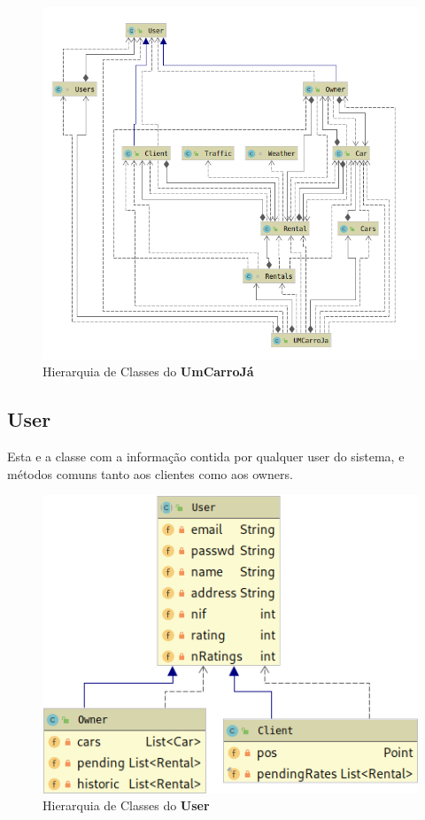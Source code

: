 \documentclass[a4paper]{report}
\begin{document}
\begin{figure}[h]
    \centering
    \includegraphics[scale=0.5]{hierarquiaUmCarroJa.png}
    \caption{Hierarquia de Classes do \textbf{UmCarroJá}}\label{fig:hUCJ}
\end{figure}


\subsection{User}

Esta e a classe com a informação contida por qualquer user do sistema,
e métodos comuns tanto aos clientes como aos owners.

\begin{figure}[h]
    \centering
    \includegraphics[scale=0.5]{hierarquiaUser.png}
    \caption{Hierarquia de Classes do \textbf{User}}
\end{figure}
\end{document}
